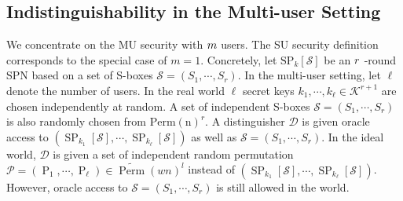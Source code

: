 \subsection{Indistinguishability in the Multi-user Setting}
We concentrate on the MU security with $\mathnormal{m}$  users. The SU security definition corresponds to the special case of $m=1$. Concretely, let $\mathrm{SP}_k[\mathcal{S}]$ be an $\mathnormal{r}$ -round SPN based on a set of S-boxes  $\mathcal{S}=(S_1, \cdots  ,S_r)$. In  the multi-user setting, let $\ell$ denote the number of users. In the real world $\ell$ secret keys  $k_1,\cdots ,k_{\ell} \in \mathcal{K}^{r+1}$  are chosen independently at random. A set of independent S-boxes $\mathcal{S}=(S_1, \cdots  ,S_r)$ is also randomly chosen from  $\operatorname{Perm(n)}^r$. A distinguisher $\mathcal{D}$  is given oracle access to $(\operatorname{SP}_{k_1}[\mathcal{S}], \cdots ,\operatorname{SP}_{k_{\ell}}[\mathcal{S}])$ as well as $\mathcal{S}=(S_1, \cdots  ,S_r)$. In the ideal world, $\mathcal{D}$ is given a set of independent random permutation $\mathcal{P} = (\operatorname{P}_1, \cdots ,\operatorname{P}_{\ell}) \in \widetilde{\operatorname{Perm}}(wn)^l$ instead of $(\operatorname{SP}_{k_1}[\mathcal{S}], \cdots ,\operatorname{SP}_{k_{\ell}}[\mathcal{S}])$. However, oracle access to $\mathcal{S}=(S_1, \cdots  ,S_r)$ is still allowed in the world. \\

